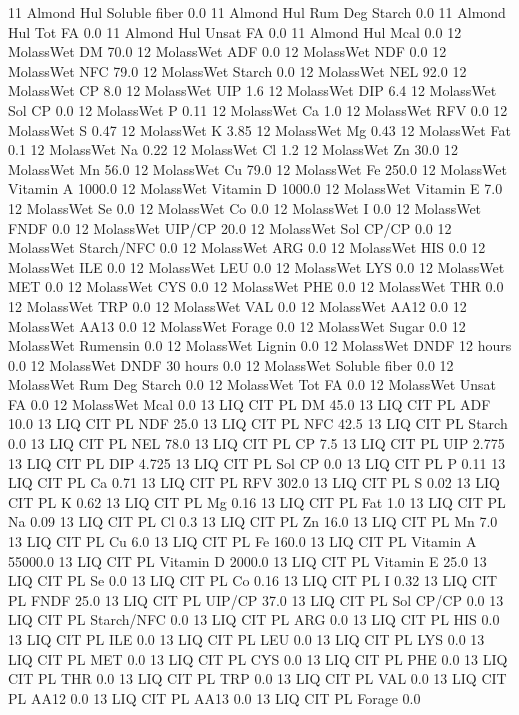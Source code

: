 \documentclass[letterpaper,10pt,english]{sphinxmanual}
\begin{document}
\begin{sphinxVerbatim}[commandchars=\\\{\},numbers=left,firstnumber=1,stepnumber=1]
11 Almond Hul Soluble fiber 0.0
11 Almond Hul Rum Deg Starch 0.0
11 Almond Hul Tot FA 0.0
11 Almond Hul Unsat FA 0.0
11 Almond Hul Mcal 0.0
12 MolassWet DM 70.0
12 MolassWet ADF 0.0
12 MolassWet NDF 0.0
12 MolassWet NFC 79.0
12 MolassWet Starch 0.0
12 MolassWet NEL 92.0
12 MolassWet CP 8.0
12 MolassWet UIP 1.6
12 MolassWet DIP 6.4
12 MolassWet Sol CP 0.0
12 MolassWet P 0.11
12 MolassWet Ca 1.0
12 MolassWet RFV 0.0
12 MolassWet S 0.47
12 MolassWet K 3.85
12 MolassWet Mg 0.43
12 MolassWet Fat 0.1
12 MolassWet Na 0.22
12 MolassWet Cl 1.2
12 MolassWet Zn 30.0
12 MolassWet Mn 56.0
12 MolassWet Cu 79.0
12 MolassWet Fe 250.0
12 MolassWet Vitamin A 1000.0
12 MolassWet Vitamin D 1000.0
12 MolassWet Vitamin E 7.0
12 MolassWet Se 0.0
12 MolassWet Co 0.0
12 MolassWet I 0.0
12 MolassWet FNDF 0.0
12 MolassWet UIP/CP 20.0
12 MolassWet Sol CP/CP 0.0
12 MolassWet Starch/NFC 0.0
12 MolassWet ARG 0.0
12 MolassWet HIS 0.0
12 MolassWet ILE 0.0
12 MolassWet LEU 0.0
12 MolassWet LYS 0.0
12 MolassWet MET 0.0
12 MolassWet CYS 0.0
12 MolassWet PHE 0.0
12 MolassWet THR 0.0
12 MolassWet TRP 0.0
12 MolassWet VAL 0.0
12 MolassWet AA\PYGZsh{}12 0.0
12 MolassWet AA\PYGZsh{}13 0.0
12 MolassWet \PYGZpc{} Forage 0.0
12 MolassWet Sugar \PYGZpc{} 0.0
12 MolassWet Rumensin 0.0
12 MolassWet Lignin 0.0
12 MolassWet DNDF 12 hours 0.0
12 MolassWet DNDF 30 hours 0.0
12 MolassWet Soluble fiber 0.0
12 MolassWet Rum Deg Starch 0.0
12 MolassWet Tot FA 0.0
12 MolassWet Unsat FA 0.0
12 MolassWet Mcal 0.0
13 LIQ CIT PL DM 45.0
13 LIQ CIT PL ADF 10.0
13 LIQ CIT PL NDF 25.0
13 LIQ CIT PL NFC 42.5
13 LIQ CIT PL Starch 0.0
13 LIQ CIT PL NEL 78.0
13 LIQ CIT PL CP 7.5
13 LIQ CIT PL UIP 2.775
13 LIQ CIT PL DIP 4.725
13 LIQ CIT PL Sol CP 0.0
13 LIQ CIT PL P 0.11
13 LIQ CIT PL Ca 0.71
13 LIQ CIT PL RFV 302.0
13 LIQ CIT PL S 0.02
13 LIQ CIT PL K 0.62
13 LIQ CIT PL Mg 0.16
13 LIQ CIT PL Fat 1.0
13 LIQ CIT PL Na 0.09
13 LIQ CIT PL Cl 0.3
13 LIQ CIT PL Zn 16.0
13 LIQ CIT PL Mn 7.0
13 LIQ CIT PL Cu 6.0
13 LIQ CIT PL Fe 160.0
13 LIQ CIT PL Vitamin A 55000.0
13 LIQ CIT PL Vitamin D 2000.0
13 LIQ CIT PL Vitamin E 25.0
13 LIQ CIT PL Se 0.0
13 LIQ CIT PL Co 0.16
13 LIQ CIT PL I 0.32
13 LIQ CIT PL FNDF 25.0
13 LIQ CIT PL UIP/CP 37.0
13 LIQ CIT PL Sol CP/CP 0.0
13 LIQ CIT PL Starch/NFC 0.0
13 LIQ CIT PL ARG 0.0
13 LIQ CIT PL HIS 0.0
13 LIQ CIT PL ILE 0.0
13 LIQ CIT PL LEU 0.0
13 LIQ CIT PL LYS 0.0
13 LIQ CIT PL MET 0.0
13 LIQ CIT PL CYS 0.0
13 LIQ CIT PL PHE 0.0
13 LIQ CIT PL THR 0.0
13 LIQ CIT PL TRP 0.0
13 LIQ CIT PL VAL 0.0
13 LIQ CIT PL AA\PYGZsh{}12 0.0
13 LIQ CIT PL AA\PYGZsh{}13 0.0
13 LIQ CIT PL \PYGZpc{} Forage 0.0

\end{sphinxVerbatim}
\end{document}
